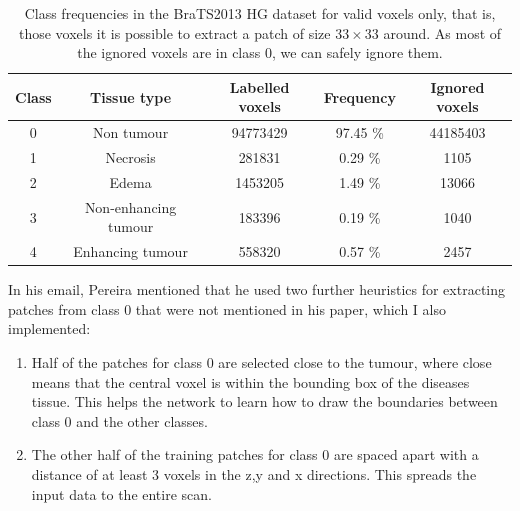 \documentclass[12pt,a4paper,twoside,openright]{report}
\begin{document}
\begin{enumerate}
		\begin{table}[h]
		\centering	
		\begin{tabular}{c c S[table-format=9.0] S[table-format=2.2] S[table-format=8.0]}
		\textbf{Class} & \textbf{Tissue type} & \textbf{Labelled voxels} & \textbf{Frequency} & \textbf{Ignored voxels}\\
		  & Non tumour 				& 94773429 	& 97.45 \% & 44185403 \\ 
		1 & Necrosis 				& 281831 	& 0.29 \% & 1105\\ 
		2 & Edema					& 1453205 	& 1.49 \% & 13066\\ 
		3 & Non-enhancing tumour 	& 183396 	& 0.19 \% & 1040\\ 
		4 & Enhancing tumour		& 558320 	& 0.57 \% & 2457\\
		\end{tabular}
		\caption{Class frequencies in the BraTS2013 HG dataset for valid voxels only, that is, those voxels it is possible to extract a patch of size $33 \times 33$ around. As most of the ignored voxels are in class 0, we can safely ignore them.}
		\label{table:valid_class_frequencies}
		\end{table}
\end{enumerate}

In his email, Pereira mentioned that he used two further heuristics for extracting patches from class 0 that were not mentioned in his paper, which I also implemented:
\begin{enumerate}
	\item Half of the patches for class 0 are selected close to the tumour, where close means that the central voxel is within the bounding box of the diseases tissue. This helps the network to learn how to draw the boundaries between class 0 and the other classes.
	\item The other half of the training patches for class 0 are spaced apart with a distance of at least 3 voxels in the z,y and x directions. This spreads the input data to the entire scan.
\end{enumerate}
\end{document}
